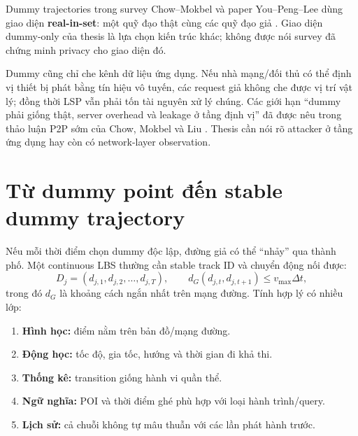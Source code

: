 \documentclass[11pt,a4paper,oneside]{report}
\begin{document}
Dummy trajectories trong survey Chow--Mokbel và paper You--Peng--Lee dùng giao
diện \textbf{real-in-set}: một quỹ đạo thật cùng các quỹ đạo giả
\cite{you2007dummies,chow2011trajectory}. Giao diện dummy-only của thesis là lựa
chọn kiến trúc khác; không được nói survey đã chứng minh privacy cho giao diện đó.

Dummy cũng chỉ che kênh dữ liệu ứng dụng. Nếu nhà mạng/đối thủ có thể định vị thiết
bị phát bằng tín hiệu vô tuyến, các request giả không che được vị trí vật lý; đồng
thời LSP vẫn phải tốn tài nguyên xử lý chúng. Các giới hạn ``dummy phải giống thật,
server overhead và leakage ở tầng định vị'' đã được nêu trong thảo luận P2P sớm của
Chow, Mokbel và Liu \cite{chow2006p2p}. Thesis cần nói rõ attacker ở tầng ứng dụng
hay còn có network-layer observation.

\section{Từ dummy point đến stable dummy trajectory}

Nếu mỗi thời điểm chọn dummy độc lập, đường giả có thể ``nhảy'' qua thành phố.
Một continuous LBS thường cần stable track ID và chuyển động nối được:
\[
D_j=(d_{j,1},d_{j,2},\ldots,d_{j,T}),\qquad
d_G(d_{j,t},d_{j,t+1})\le v_{\max}\Delta t,
\]
trong đó $d_G$ là khoảng cách ngắn nhất trên mạng đường. Tính hợp lý có nhiều lớp:

\begin{enumerate}
  \item \textbf{Hình học:} điểm nằm trên bản đồ/mạng đường.
  \item \textbf{Động học:} tốc độ, gia tốc, hướng và thời gian đi khả thi.
  \item \textbf{Thống kê:} transition giống hành vi quần thể.
  \item \textbf{Ngữ nghĩa:} POI và thời điểm ghé phù hợp với loại hành trình/query.
  \item \textbf{Lịch sử:} cả chuỗi không tự mâu thuẫn với các lần phát hành trước.
\end{enumerate}
\end{document}

